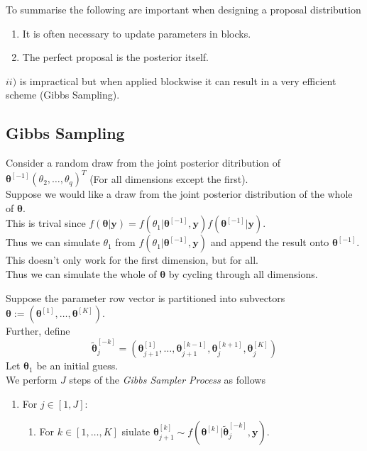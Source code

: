 \documentclass[11pt,a4paper]{article}
\begin{document}
To summarise the following are important when designing a proposal distribution
\begin{enumerate}
	\item It is often necessary to update parameters in blocks.
	\item The perfect proposal is the posterior itself.
\end{enumerate}
\nb $ii)$ is impractical but when applied blockwise it can result in a very efficient scheme (\ie Gibbs Sampling).

\subsection{Gibbs Sampling}

Consider a random draw from the joint posterior ditribution of $\pmb\theta^{[-1]}(\theta_2,\dots,\theta_q)^T$ (\ie For all dimensions except the first).\\
Suppose we would like a draw from the joint posterior distribution of the whole of $\pmb\theta$.\\
This is trival since $f(\pmb\theta|\textbf{y})=f(\theta_1|\pmb\theta^{[-1]},\textbf{y})f(\pmb\theta^{[-1]}|\textbf{y})$.\\
Thus we can simulate $\theta_1$ from $f(\theta_1|\pmb\theta^{[-1]},\textbf{y})$ and append the result onto $\pmb\theta^{[-1]}$.\\
This doesn't only work for the first dimension, but for all.\\
Thus we can simulate the whole of $\pmb\theta$ by cycling through all dimensions.

Suppose the parameter row vector is partitioned into subvectors $\pmb\theta:=(\pmb\theta^{[1]},\dots,\pmb\theta^{[K]})$.\\
Further, define
$$\tilde{\pmb\theta}_j^{[-k]}=(\pmb\theta^{[1]}_{j+1},\dots,\pmb\theta^{[k-1]}_{j+1},\pmb\theta^{[k+1]}_j,\pmb\theta^{[K]}_j)$$
Let $\pmb\theta_1$ be an initial guess.\\
We perform $J$ steps of the \textit{Gibbs Sampler Process} as follows
\begin{enumerate}
	\item For $j\in[1,J]$:
	\begin{enumerate}
		\item For $k\in[1,\dots,K]$ siulate $\pmb\theta_{j+1}^{[k]}\sim f(\pmb\theta^{[k]}|\tilde{\pmb\theta}_j^{[-k]},\textbf{y})$.
	\end{enumerate}
\end{enumerate}
\end{document}
